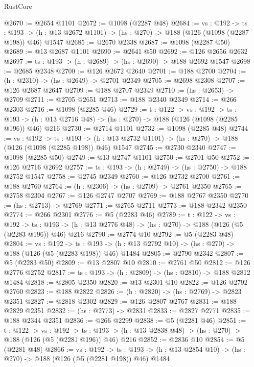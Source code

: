 \begin{lexlean}{RustCore}
\begin{coremodule}
@2670 := @2654 @1101
@2672 := @1098 (@2287 @48)
@2684 := {vs : @192} ->
  {ts : @193} -> (h : @13 @2672 @1101) -> (hs : @270) -> @188 (@126 (@1098 (@2287 @198)) @46) @1547
@2685 := @2670 @2338
@2687 := @1098 (@2287 @50)
@2689 := @13 @2687 @1101
@2690 := @2641 @50
@2692 := @126 @2656 @2632
@2697 := {ts : @193} -> (h : @2689) -> (hs : @2690) -> @188 @2692 @1547
@2698 := @2685 @2348
@2700 := @126 @2672 @2640
@2701 := @188 @2700
@2704 := (h : @2310) -> (hs : @2649) -> @2701 @2349
@2705 := @2698 @2308
@2707 := @126 @2687 @2647
@2709 := @188 @2707 @2349
@2710 := (hs : @2653) -> @2709
@2711 := @2705 @2651
@2713 := @188 @2340 @2349
@2714 := @266 @2303
@2716 := @1098 (@2285 @46)
@2729 := {t : @122} ->
  {vs : @192} ->
  {ts : @193} -> (h : @13 @2716 @48) -> (hs : @270) -> @188 (@126 (@1098 (@2285 @196)) @46) @216
@2730 := @2714 @1101
@2732 := @1098 (@2285 @48)
@2744 := {vs : @192} ->
  {ts : @193} -> (h : @13 @2732 @1101) -> (hs : @270) -> @188 (@126 (@1098 (@2285 @198)) @46) @1547
@2745 := @2730 @2340
@2747 := @1098 (@2285 @50)
@2749 := @13 @2747 @1101
@2750 := @2701 @50
@2752 := @126 @2716 @2692
@2757 := {ts : @193} -> (h : @2749) -> (hs : @2750) -> @188 @2752 @1547
@2758 := @2745 @2349
@2760 := @126 @2732 @2700
@2761 := @188 @2760
@2764 := (h : @2306) -> (hs : @2709) -> @2761 @2350
@2765 := @2758 @2304
@2767 := @126 @2747 @2707
@2769 := @188 @2767 @2350
@2770 := (hs : @2713) -> @2769
@2771 := @2765 @2711
@2773 := @188 @2342 @2350
@2774 := @266 @2301
@2776 := @5 (@2283 @46)
@2789 := {t : @122} ->
  {vs : @192} ->
  {ts : @193} -> (h : @13 @2776 @48) -> (hs : @270) -> @188 (@126 (@5 (@2283 @196)) @46) @216
@2790 := @2774 @10
@2792 := @5 (@2283 @48)
@2804 := {vs : @192} ->
  {ts : @193} -> (h : @13 @2792 @10) -> (hs : @270) -> @188 (@126 (@5 (@2283 @198)) @46) @1484
@2805 := @2790 @2342
@2807 := @5 (@2283 @50)
@2809 := @13 @2807 @10
@2810 := @2761 @50
@2812 := @126 @2776 @2752
@2817 := {ts : @193} -> (h : @2809) -> (hs : @2810) -> @188 @2812 @1484
@2818 := @2805 @2350
@2820 := @13 @2301 @10
@2822 := @126 @2792 @2760
@2823 := @188 @2822
@2826 := (h : @2820) -> (hs : @2769) -> @2823 @2351
@2827 := @2818 @2302
@2829 := @126 @2807 @2767
@2831 := @188 @2829 @2351
@2832 := (hs : @2773) -> @2831
@2833 := @2827 @2771
@2835 := @188 @2344 @2351
@2836 := @266 @2299
@2838 := @5 (@2281 @46)
@2851 := {t : @122} ->
  {vs : @192} ->
  {ts : @193} -> (h : @13 @2838 @48) -> (hs : @270) -> @188 (@126 (@5 (@2281 @196)) @46) @216
@2852 := @2836 @10
@2854 := @5 (@2281 @48)
@2866 := {vs : @192} ->
  {ts : @193} -> (h : @13 @2854 @10) -> (hs : @270) -> @188 (@126 (@5 (@2281 @198)) @46) @1484

\end{coremodule}
\end{lexlean}
